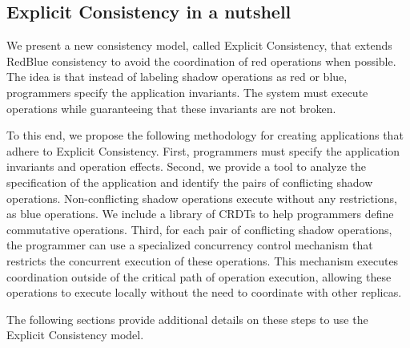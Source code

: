 \subsection{Explicit Consistency in a nutshell}
We present a new consistency model, called Explicit Consistency, that extends
RedBlue consistency to avoid the coordination of red operations when possible.
The idea is that instead of labeling shadow operations as red or blue,
programmers specify the application invariants.
The system must execute operations while guaranteeing that these invariants are
not broken.

To this end, we propose the following methodology for creating applications
that adhere to Explicit Consistency.
First, programmers must specify the application invariants and operation effects.
Second, we provide a tool to analyze the specification of the application
and identify the pairs of conflicting shadow operations.
Non-conflicting shadow operations execute without any restrictions, as blue
operations. We include a library of CRDTs to help programmers define
commutative operations.
Third, for each pair of conflicting shadow operations,
the programmer can use a specialized concurrency control mechanism
that restricts the concurrent execution of these operations.
This mechanism executes coordination outside of the critical path of
operation execution, allowing these operations to execute locally
without the need to coordinate with other replicas.

The following sections provide additional details on these steps to
use the Explicit Consistency model.

%
%

